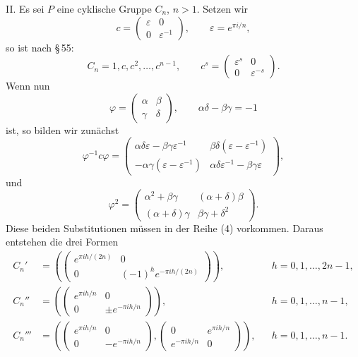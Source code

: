\documentclass[11pt]{article}
\begin{document}
II. Es sei $P$ eine cyklische Gruppe $C_n$, $n>1$. Setzen wir
\begin{equation}
 c=\begin{pmatrix}\varepsilon&0\\0&\varepsilon^{-1}\end{pmatrix},
 \qquad \varepsilon=e^{\pi i/n}, \tag{3}
\end{equation}
so ist nach \S\,55:
\begin{equation}
 C_n=1,c,c^2,\ldots,c^{n-1},\qquad
 c^s=\begin{pmatrix}\varepsilon^s&0\\0&\varepsilon^{-s}\end{pmatrix}. \tag{4}
\end{equation}
Wenn nun
\begin{equation}
 \varphi=\begin{pmatrix}\alpha&\beta\\\gamma&\delta\end{pmatrix},
 \qquad \alpha\delta-\beta\gamma=-1 \tag{5}
\end{equation}
ist, so bilden wir zunächst
\begin{equation}
 \varphi^{-1}c\varphi=
 \begin{pmatrix}
 \alpha\delta\varepsilon-\beta\gamma\varepsilon^{-1}&
 \beta\delta(\varepsilon-\varepsilon^{-1})\\
 -\alpha\gamma(\varepsilon-\varepsilon^{-1})&
 \alpha\delta\varepsilon^{-1}-\beta\gamma\varepsilon
 \end{pmatrix}, \tag{6}
\end{equation}
und
\begin{equation}
 \varphi^2=
 \begin{pmatrix}
 \alpha^2+\beta\gamma&(\alpha+\delta)\beta\\
 (\alpha+\delta)\gamma&\beta\gamma+\delta^2
 \end{pmatrix}. \tag{7}
\end{equation}
Diese beiden Substitutionen müssen in der Reihe (4) vorkommen. Daraus entstehen die drei Formen
\[
\begin{aligned}
 C_n'&=\left(
 \begin{pmatrix}e^{\pi i h/(2n)}&0\\
 0&(-1)^h e^{-\pi i h/(2n)}\end{pmatrix}
 \right), &&h=0,1,\ldots,2n-1,\\[0.4em]
 C_n''&=\left(
 \begin{pmatrix}e^{\pi i h/n}&0\\
 0&\pm e^{-\pi i h/n}\end{pmatrix}
 \right), &&h=0,1,\ldots,n-1,\\[0.4em]
 C_n'''&=\left(
 \begin{pmatrix}e^{\pi i h/n}&0\\0&-e^{-\pi i h/n}\end{pmatrix},
 \begin{pmatrix}0&e^{\pi i h/n}\\ e^{-\pi i h/n}&0\end{pmatrix}
 \right), &&h=0,1,\ldots,n-1.
\end{aligned}
\]
\end{document}
